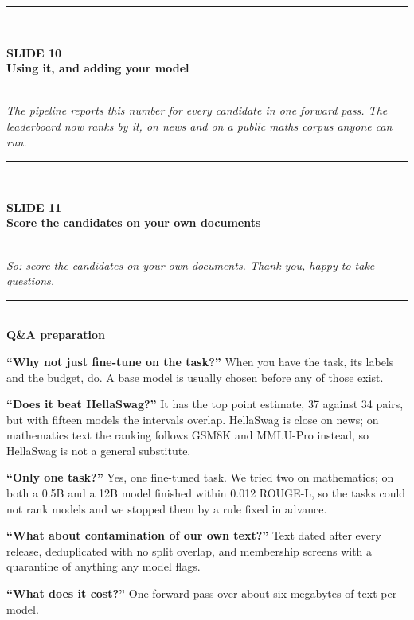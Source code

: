 \documentclass[11pt,a4paper]{article}
\newcommand{\slide}[3]{%
  \vspace{1.0em}%
  {\color{rule}\rule{\textwidth}{0.6pt}}\\[0.35em]%
  \begin{minipage}[t]{0.78\textwidth}%
    {\color{accent}\footnotesize\bfseries SLIDE #1}\\[0.15em]%
    {\large\bfseries #2}%
  \end{minipage}\hfill%
  \begin{minipage}[t]{0.20\textwidth}%
    \raggedleft{\footnotesize\color{mute}#3}%
  \end{minipage}\\[0.5em]%
}
\newenvironment{say}{\itshape}{\par}
\begin{document}
\slide{10}{Using it, and adding your model}{6:30--7:00}
\begin{say}
The pipeline reports this number for every candidate in one forward pass. The leaderboard now ranks
by it, on news and on a public maths corpus anyone can run.
\end{say}

\slide{11}{Score the candidates on your own documents}{7:00--7:08}
\begin{say}
So: score the candidates on your own documents. Thank you, happy to take questions.
\end{say}

\vspace{1.4em}
{\color{rule}\rule{\textwidth}{0.6pt}}\\[0.4em]
{\large\bfseries Q\&A preparation}

\textbf{``Why not just fine-tune on the task?''} When you have the task, its labels and the budget,
do. A base model is usually chosen before any of those exist.

\textbf{``Does it beat HellaSwag?''} It has the top point estimate, 37 against 34 pairs, but with
fifteen models the intervals overlap. HellaSwag is close on news; on mathematics text the ranking
follows GSM8K and MMLU-Pro instead, so HellaSwag is not a general substitute.

\textbf{``Only one task?''} Yes, one fine-tuned task. We tried two on mathematics; on both a 0.5B and
a 12B model finished within 0.012 ROUGE-L, so the tasks could not rank models and we stopped them
by a rule fixed in advance.

\textbf{``What about contamination of our own text?''} Text dated after every release, deduplicated
with no split overlap, and membership screens with a quarantine of anything any model flags.

\textbf{``What does it cost?''} One forward pass over about six megabytes of text per model.
\end{document}
